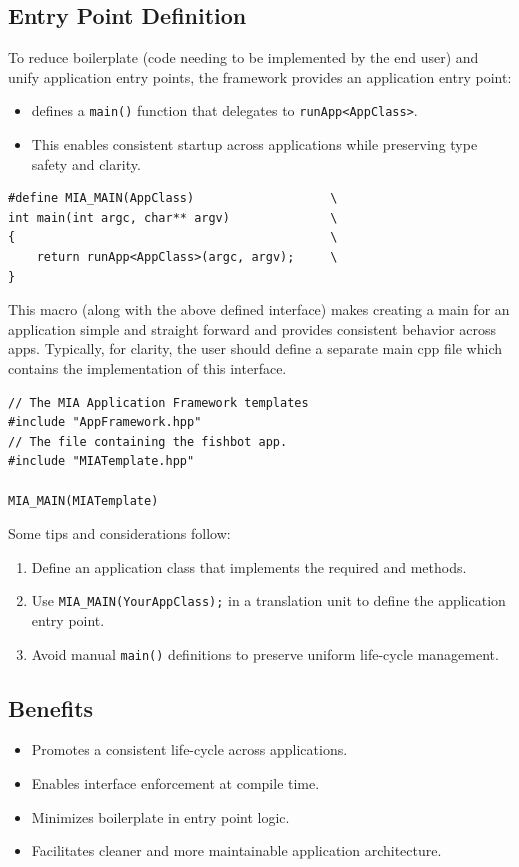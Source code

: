 \subsection{Entry Point Definition}
To reduce boilerplate (code needing to be implemented by the end user) and unify application entry points, the framework provides an application  entry point:
\begin{itemize}\itemsep0em
	\item {} defines a \texttt{main()} function that delegates to \texttt{runApp<AppClass>}.
	\item This enables consistent startup across applications while preserving type safety and clarity.
\end{itemize}
\begin{lstlisting}[style=cppstyle]
#define MIA_MAIN(AppClass)                   \
int main(int argc, char** argv)              \
{                                            \
    return runApp<AppClass>(argc, argv);     \
}
\end{lstlisting}
This macro (along with the above defined interface) makes creating a main for an application simple and straight forward and provides consistent behavior across apps. Typically, for clarity, the user should define a separate main cpp file which contains the implementation of this interface.
\begin{lstlisting}[style=cppstyle]
// The MIA Application Framework templates
#include "AppFramework.hpp"
// The file containing the fishbot app.
#include "MIATemplate.hpp"

MIA_MAIN(MIATemplate)
\end{lstlisting}
Some tips and considerations follow:
\begin{enumerate}
	\item Define an application class that implements the required  and  methods.
	\item Use \texttt{MIA\_MAIN(YourAppClass);} in a translation unit to define the application entry point.
	\item Avoid manual \texttt{main()} definitions to preserve uniform life-cycle management.
\end{enumerate}

\subsection{Benefits}
\begin{itemize}\itemsep0em
	\item Promotes a consistent life-cycle across applications.
	\item Enables interface enforcement at compile time.
	\item Minimizes boilerplate in entry point logic.
	\item Facilitates cleaner and more maintainable application architecture.
\end{itemize}











